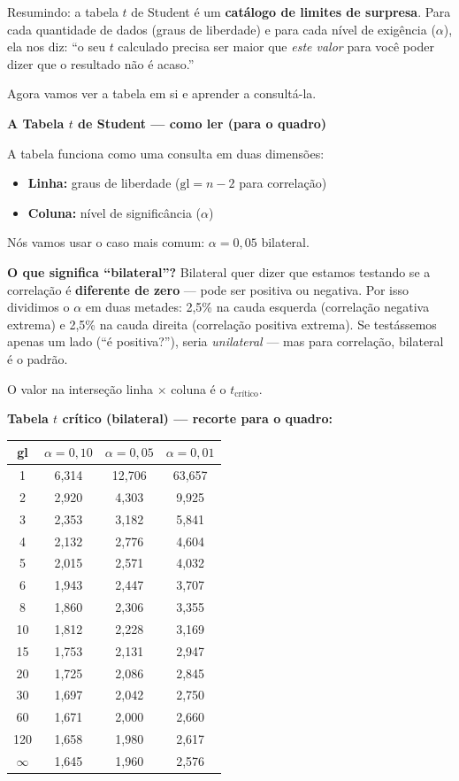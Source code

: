 Resumindo: a tabela $t$ de Student é um \textbf{catálogo de limites de
surpresa}. Para cada quantidade de dados (graus de liberdade) e para
cada nível de exigência ($\alpha$), ela nos diz: ``o seu $t$ calculado
precisa ser maior que \emph{este valor} para você poder dizer que o
resultado não é acaso.''

Agora vamos ver a tabela em si e aprender a consultá-la.

\begin{BoardBox}
\textbf{A Tabela $t$ de Student — como ler (para o quadro)}

A tabela funciona como uma consulta em duas dimensões:
\begin{itemize}
  \item \textbf{Linha:} graus de liberdade ($\text{gl} = n - 2$ para correlação)
  \item \textbf{Coluna:} nível de significância ($\alpha$)
\end{itemize}

Nós vamos usar o caso mais comum: $\alpha = 0{,}05$ bilateral.

\textbf{O que significa ``bilateral''?}
Bilateral quer dizer que estamos testando se a correlação é
\textbf{diferente de zero} --- pode ser positiva ou negativa.
Por isso dividimos o $\alpha$ em duas metades: 2{,}5\% na cauda
esquerda (correlação negativa extrema) e 2{,}5\% na cauda direita
(correlação positiva extrema). Se testássemos apenas um lado
(``é positiva?''), seria \textit{unilateral} --- mas para correlação,
bilateral é o padrão.

O valor na interseção linha $\times$ coluna é o $t_{\text{crítico}}$.

\medskip
\textbf{Tabela $t$ crítico (bilateral) — recorte para o quadro:}

\medskip
\begin{center}
\begin{tabular}{|c|c|c|c|}
\hline
\textbf{gl} & $\alpha = 0{,}10$ & $\alpha = 0{,}05$ & $\alpha = 0{,}01$ \\
\hline
1  & 6,314 & 12,706 & 63,657 \\
2  & 2,920 & 4,303  & 9,925 \\
3  & 2,353 & 3,182  & 5,841 \\
4  & 2,132 & 2,776  & 4,604 \\
5  & 2,015 & 2,571  & 4,032 \\
6  & 1,943 & 2,447  & 3,707 \\
8  & 1,860 & 2,306  & 3,355 \\
10 & 1,812 & 2,228  & 3,169 \\
15 & 1,753 & 2,131  & 2,947 \\
20 & 1,725 & 2,086  & 2,845 \\
30 & 1,697 & 2,042  & 2,750 \\
60 & 1,671 & 2,000  & 2,660 \\
120 & 1,658 & 1,980  & 2,617 \\
$\infty$ & 1,645 & 1,960 & 2,576 \\
\hline
\end{tabular}
\end{center}


\end{BoardBox}
